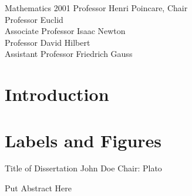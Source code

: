 \documentclass[leqno]{report}
\theoremstyle{plain}
\theoremstyle{definition}
\theoremstyle{remark}
\numberwithin{theorem}{chapter}        %
\begin{document}





{Mathematics} {2001}
{ Professor Henri Poincare, Chair \\
  Professor Euclid\\
  Associate Professor Isaac Newton\\
  Professor David Hilbert \\
  Assistant Professor Friedrich Gauss }



\initializefrontsections


\setcounter{page}{1}





\tableofcontents
\listoffigures

\startthechapters 



\chapter{Introduction}
\label{intro} 

\chapter{Labels and Figures}
\label{chap2}

%
%


%



\startabstractpage
{Title of Dissertation} {John Doe} {Chair: Plato}

Put Abstract Here
\end{document}
